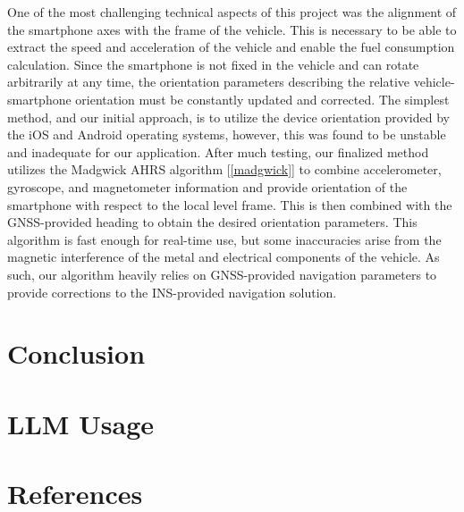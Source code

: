 \documentclass[11pt, oneside]{article}
\begin{document}
One of the most challenging technical aspects of this project was the alignment of the smartphone axes with the frame of the vehicle.  This is necessary to be able to extract the speed and acceleration of the vehicle and enable the fuel consumption calculation.  Since the smartphone is not fixed in the vehicle and can rotate arbitrarily at any time, the orientation parameters describing the relative vehicle-smartphone orientation must be constantly updated and corrected.  The simplest method, and our initial approach, is to utilize the device orientation provided by the iOS and Android operating systems, however, this was found to be unstable and inadequate for our application.  After much testing, our finalized method utilizes the Madgwick AHRS algorithm [\ref*{madgwick}] to combine accelerometer, gyroscope, and magnetometer information and provide orientation of the smartphone with respect to the local level frame.  This is then combined with the GNSS-provided heading to obtain the desired orientation parameters.  This algorithm is fast enough for real-time use, but some inaccuracies arise from the magnetic interference of the metal and electrical components of the vehicle.  As such, our algorithm heavily relies on GNSS-provided navigation parameters to provide corrections to the INS-provided navigation solution.

\section{Conclusion}

\section{LLM Usage}
 
\section{References}
\end{document}
